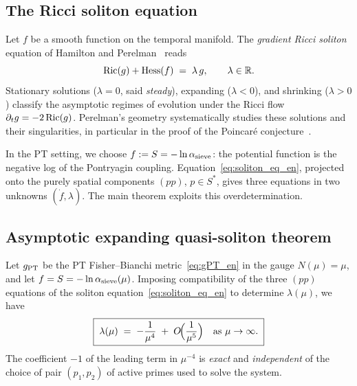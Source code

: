 \subsection{The Ricci soliton equation}
\label{sec:soliton:eq}

Let $f$ be a smooth function on the temporal manifold. The \emph{gradient Ricci soliton} equation of Hamilton and Perelman~\cite{Hamilton1982,Perelman2002} reads
\begin{equation}
\mathrm{Ric}(g) + \mathrm{Hess}(f) \;=\; \lambda\, g, \qquad \lambda \in \mathbb R.
\label{eq:soliton_eq_en}
\end{equation}
Stationary solutions ($\lambda = 0$, said \emph{steady}), expanding ($\lambda < 0$), and shrinking ($\lambda > 0$) classify the asymptotic regimes of evolution under the Ricci flow $\partial_t g = -2\,\mathrm{Ric}(g)$. Perelman's geometry systematically studies these solutions and their singularities, in particular in the proof of the Poincaré conjecture~\cite{Perelman2002}.

In the PT setting, we choose $f := S = -\ln \alpha_{\rm sieve}$: the potential function is the negative log of the Pontryagin coupling. Equation~\eqref{eq:soliton_eq_en}, projected onto the purely spatial components $(pp)$, $p \in S^{*}$, gives three equations in two unknowns $(\dot f, \lambda)$. The main theorem exploits this overdetermination.

\subsection{Asymptotic expanding quasi-soliton theorem}
\label{sec:soliton:thm}

\begin{theoreme}
\label{thm:soliton_PT_en}
Let $g_{\rm PT}$ be the PT Fisher--Bianchi metric~\eqref{eq:gPT_en} in the gauge $N(\mu) = \mu$, and let $f = S = -\ln \alpha_{\rm sieve}(\mu)$. Imposing compatibility of the three $(pp)$ equations of the soliton equation~\eqref{eq:soliton_eq_en} to determine $\lambda(\mu)$, we have
\begin{equation}
\boxed{\;
\lambda(\mu) \;=\; -\dfrac{1}{\mu^{4}} \;+\; O\!\Bigl(\dfrac{1}{\mu^{5}}\Bigr)
\quad\text{as } \mu \to \infty.
\;}
\label{eq:lambda_main_en}
\end{equation}
The coefficient $-1$ of the leading term in $\mu^{-4}$ is \emph{exact} and \emph{independent} of the choice of pair $(p_1, p_2)$ of active primes used to solve the system.
\end{theoreme}

